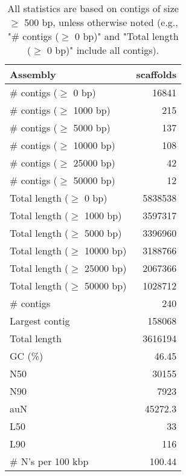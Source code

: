 \documentclass[12pt,a4paper]{article}
\begin{document}
\begin{table}[ht]
\begin{center}
\caption{All statistics are based on contigs of size $\geq$ 500 bp, unless otherwise noted (e.g., "\# contigs ($\geq$ 0 bp)" and "Total length ($\geq$ 0 bp)" include all contigs).}
\begin{tabular}{|l*{1}{|r}|}
\hline
Assembly & scaffolds \\ \hline
\# contigs ($\geq$ 0 bp) & 16841 \\ \hline
\# contigs ($\geq$ 1000 bp) & 215 \\ \hline
\# contigs ($\geq$ 5000 bp) & 137 \\ \hline
\# contigs ($\geq$ 10000 bp) & 108 \\ \hline
\# contigs ($\geq$ 25000 bp) & 42 \\ \hline
\# contigs ($\geq$ 50000 bp) & 12 \\ \hline
Total length ($\geq$ 0 bp) & 5838538 \\ \hline
Total length ($\geq$ 1000 bp) & 3597317 \\ \hline
Total length ($\geq$ 5000 bp) & 3396960 \\ \hline
Total length ($\geq$ 10000 bp) & 3188766 \\ \hline
Total length ($\geq$ 25000 bp) & 2067366 \\ \hline
Total length ($\geq$ 50000 bp) & 1028712 \\ \hline
\# contigs & 240 \\ \hline
Largest contig & 158068 \\ \hline
Total length & 3616194 \\ \hline
GC (\%) & 46.45 \\ \hline
N50 & 30155 \\ \hline
N90 & 7923 \\ \hline
auN & 45272.3 \\ \hline
L50 & 33 \\ \hline
L90 & 116 \\ \hline
\# N's per 100 kbp & 100.44 \\ \hline
\end{tabular}
\end{center}
\end{table}
\end{document}

